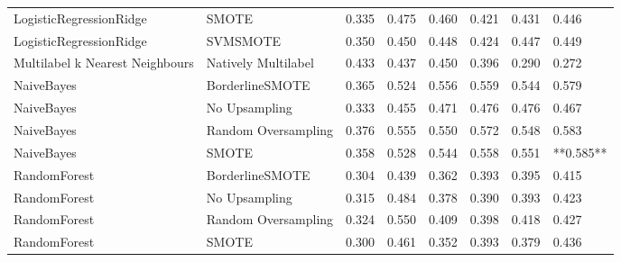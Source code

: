 \begin{tabular}{llllllll}
        LogisticRegressionRidge &                         SMOTE & 0.335 &                     0.475 &                 0.460 &                  0.421 &                                   0.431 &     0.446 \\
        LogisticRegressionRidge &                      SVMSMOTE & 0.350 &                     0.450 &                 0.448 &                  0.424 &                                   0.447 &     0.449 \\
Multilabel k Nearest Neighbours &           Natively Multilabel & 0.433 &                     0.437 &                 0.450 &                  0.396 &                                   0.290 &     0.272 \\
                     NaiveBayes &               BorderlineSMOTE & 0.365 &                     0.524 &                 0.556 &                  0.559 &                                   0.544 &     0.579 \\
                     NaiveBayes &                 No Upsampling & 0.333 &                     0.455 &                 0.471 &                  0.476 &                                   0.476 &     0.467 \\
                     NaiveBayes &           Random Oversampling & 0.376 &                     0.555 &                 0.550 &                  0.572 &                                   0.548 &     0.583 \\
                     NaiveBayes &                         SMOTE & 0.358 &                     0.528 &                 0.544 &                  0.558 &                                   0.551 & **0.585** \\
                   RandomForest &               BorderlineSMOTE & 0.304 &                     0.439 &                 0.362 &                  0.393 &                                   0.395 &     0.415 \\
                   RandomForest &                 No Upsampling & 0.315 &                     0.484 &                 0.378 &                  0.390 &                                   0.393 &     0.423 \\
                   RandomForest &           Random Oversampling & 0.324 &                     0.550 &                 0.409 &                  0.398 &                                   0.418 &     0.427 \\
                   RandomForest &                         SMOTE & 0.300 &                     0.461 &                 0.352 &                  0.393 &                                   0.379 &     0.436 \\

\end{tabular}
